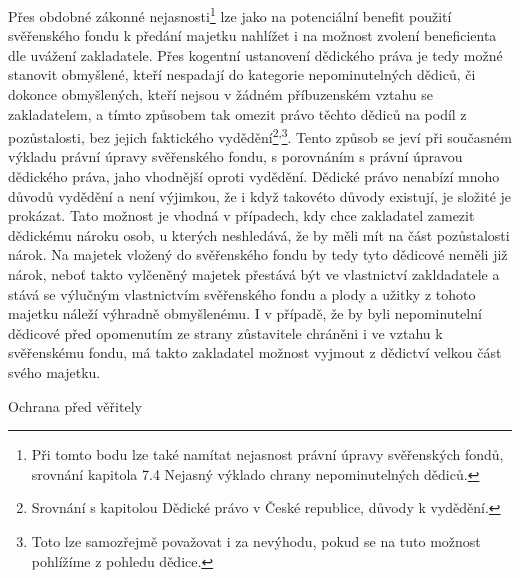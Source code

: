 \documentclass{article}
\begin{document}
 Přes obdobné zákonné nejasnosti\footnote{Při tomto bodu lze také namítat nejasnost právní úpravy svěřenských fondů, srovnání kapitola 7.4 Nejasný výklado chrany nepominutelných dědiců.} lze jako na potenciální benefit použití svěřen\-ského fondu k předání majetku nahlížet i na možnost zvolení beneficienta dle uvážení zakladatele. Přes kogentní ustanovení dědického práva je tedy možné stanovit obmyšlené, kteří nespadají do kategorie nepominutelných dědiců, či dokonce obmyšlených, kteří nejsou v žádném příbuzenském vztahu se zakladatelem, a tímto způsobem tak omezit právo těchto dědiců na podíl z pozůstalosti, bez jejich faktického vydědění\footnote{Srovnání s kapitolou Dědické právo v České republice, důvody k vydědění.}\textsuperscript{,}\footnote{Toto lze samozřejmě považovat i za nevýhodu, pokud se na tuto možnost pohlížíme z pohledu dědice.}. Tento způsob se jeví při současném výkladu právní úpravy svěřenského fondu, s porovnáním s právní úpravou dědického práva, jaho vhodnější oproti vydědění. Dědické právo nenabízí mnoho důvodů vydědění a není výjimkou, že i když takovéto důvody existují, je složité je prokázat. Tato možnost je vhodná v případech, kdy chce zakladatel zamezit dědickému nároku osob, u kterých neshledává, že by měli mít na část pozůstalosti nárok. Na majetek vložený do svěřenského fondu by tedy tyto dědicové neměli již nárok, neboť takto vylčeněný majetek přestává být ve vlastnictví zakldadatele a stává se výlučným vlastnictvím svěřenského fondu a plody a užitky z tohoto majetku náleží výhradně obmyšlenému. I v případě, že by byli nepominutelní dědicové před opomenutím ze strany zůstavitele chráněni i ve vztahu k svěřenskému fondu, má takto zakladatel možnost vyjmout z dědictví velkou část svého majetku.
 
 
 \newpage
 \thispagestyle{smallertextinheader}
  \begin{enumerate}
 {\Large\item[2.] Ochrana před věřitely}
 \end{enumerate}
 
\end{document}
